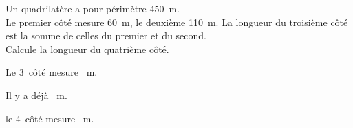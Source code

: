 Un quadrilatère a pour périmètre 450~m.\\Le premier côté mesure 60~m, le deuxième 110~m. La longueur du troisième côté est la somme de celles du premier et du second.\\Calcule la longueur du quatrième côté.
\begin{multicols}{3}
\par Le 3\ieme\ côté mesure ~m.\par
{}
\par Il y a déjà ~m.
\par
{}
\par le 4\ieme\ côté mesure ~m.
\end{multicols}
